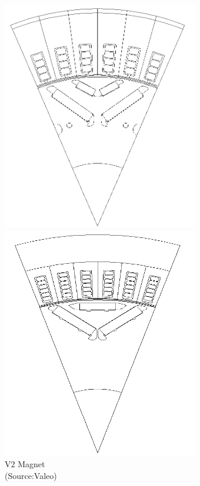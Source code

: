 \documentclass{report} %
\begin{document}
\begin{figure}[H]
\begin{minipage}[b]{0.325\textwidth}
        \includegraphics[width=\textwidth]{./ReportImages/2V_Magnet.png}
        \caption{\centering V2 Magnet\\ (Source:Valeo)}
        \label{fig:V2 Magnet}
    \end{minipage}
    \hfill
    \begin{minipage}[b]{0.325\textwidth}
        \centering
        \includegraphics[width=\textwidth]{./ReportImages/Nabla_Magnet.png}

\end{minipage}
\end{figure}
\end{document}
